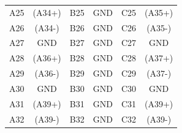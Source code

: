 \documentclass[a4paper]{article}
\begin{document}
\begin{table}[h]
\begin{center}
\begin{tabular}{cc|cc|cc}
            A25 & (A34+) & B25 & GND & C25 & (A35+) \\
            A26 & (A34-) & B26 & GND & C26 & (A35-) \\
            A27 & GND & B27 & GND & C27 & GND \\
            A28 & (A36+) & B28 & GND & C28 & (A37+) \\
            A29 & (A36-) & B29 & GND & C29 & (A37-) \\
            A30 & GND & B30 & GND & C30 & GND \\
            A31 & (A39+) & B31 & GND & C31 & (A39+) \\
            A32 & (A39-) & B32 & GND & C32 & (A39-) \\
            \hline
            \hline
        \end{tabular}
    \end{center}
\end{table}
\end{document}
